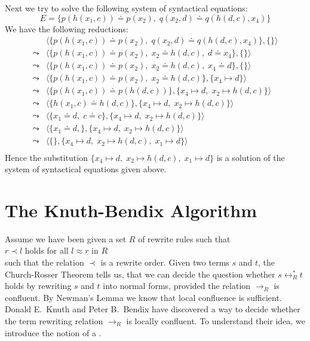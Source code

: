 \example
Next we try to solve the following system of syntactical equations: 
\[ E = \big\{ p(h(x_1,c)) \doteq p(x_2),\; q(x_2, d) \doteq q(h(d,c),x_4) \big\} \]
We have the following reductions:
$$
\begin{array}{ll}
          & \big\langle \big\{ p(h(x_1,c)) \doteq p(x_2),\; q(x_2, d) \doteq q(h(d,c),x_4) \big\}, \{ \} \big\rangle \\[0.2cm]
 \leadsto & \big\langle \big\{ p(h(x_1,c)) \doteq p(x_2),\; x_2 \doteq h(d,c), \; d \doteq x_4 \big\}, \{ \} \big\rangle \\[0.2cm]
 \leadsto & \big\langle \big\{ p(h(x_1,c)) \doteq p(x_2),\; x_2 \doteq h(d,c), \; x_4 \doteq d \big\}, \{ \} \big\rangle \\[0.2cm]
 \leadsto & \big\langle \big\{ p(h(x_1,c)) \doteq p(x_2),\; x_2 \doteq h(d,c) \big\}, \{ x_4 \mapsto d \} \big\rangle \\[0.2cm]
 \leadsto & \big\langle \big\{ p(h(x_1,c)) \doteq p(h(d,c)) \big\}, \{ x_4 \mapsto d,\; x_2 \mapsto h(d,c) \} \big\rangle \\[0.2cm]
 \leadsto & \big\langle \big\{ h(x_1,c) \doteq h(d,c) \big\}, \{ x_4 \mapsto d,\; x_2 \mapsto h(d,c) \} \big\rangle \\[0.2cm]
 \leadsto & \big\langle \big\{ x_1 \doteq d,\; c \doteq c \big\}, \{ x_4 \mapsto d,\; x_2 \mapsto h(d,c) \} \big\rangle \\[0.2cm]
 \leadsto & \big\langle \big\{ x_1 \doteq d,\big\}, \{ x_4 \mapsto d,\; x_2 \mapsto h(d,c) \} \big\rangle \\[0.2cm]
 \leadsto & \big\langle \big\{\big\}, \{ x_4 \mapsto d,\; x_2 \mapsto h(d,c),\; x_1 \mapsto d \} \big\rangle \\[0.2cm]
\end{array}
$$
Hence the  substitution  $\{ x_4 \mapsto d,\; x_2 \mapsto h(d,c),\; x_1 \mapsto d \}$ is a solution
of the system of syntactical equations given above.
\eox


\section{The Knuth-Bendix Algorithm}
Assume we have been given a set $R$ of rewrite rules such that
\\[0.2cm]
\hspace*{1.3cm}
$r \prec l$ \quad holds for all $l \approx r$ in $R$
\\[0.2cm]
such that the relation $\prec$ is a rewrite order.
Given two terms $s$ and $t$, the Church-Rosser Theorem tells us, that we can decide the question whether
$s \leftrightarrow_R^* t$ holds by rewriting $s$ and $t$ into normal forms, provided the relation
$\rightarrow_R$ is confluent.  By Newman's Lemma we know that local confluence is sufficient.  Donald E.~Knuth
and Peter B.~Bendix \cite{knuth:1970} have discovered a way to decide whether the term rewriting relation
$\rightarrow_R$ is locally confluent.  To understand their idea, we introduce the notion of a .

